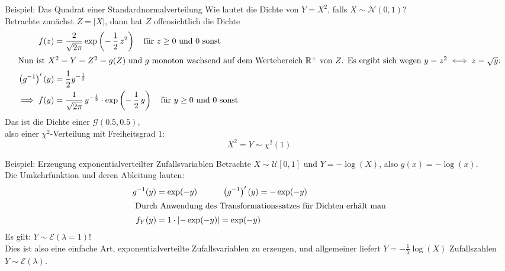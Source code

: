 \documentclass[
  10pt,
  ignorenonframetext,
]{beamer}
\begin{document}
\begin{frame}{Beispiel: Das Quadrat einer Standardnormalverteilung}
\protect\hypertarget{beispiel-das-quadrat-einer-standardnormalverteilung}{}
Wie lautet die Dichte von \(Y = X^2\), falls
\(X \sim {\mathcal N}(0,1)\)?\\
Betrachte zunächst \(Z = |X|\), dann hat \(Z\) offensichtlich die Dichte
\begin{align*}
f(z) &= \frac{2}{\sqrt{2 \pi}} \exp\left(- \, \frac{1}{2}\, z^2\right)
\quad \mbox{für $z \geq 0$ und $0$ sonst}\\
\intertext{Nun ist $X^2 = Y = Z^2 = g(Z)$ und $g$ monoton wachsend auf dem Wertebereich
$\mathbb{R}^+$ von $Z$. Es ergibt sich wegen $y = z^2 \iff z = \sqrt{y}$:}
\left(g^{-1}\right)'(y) &=  \frac{1}{2} y^{-\frac{1}{2}} \\
\implies f(y) & =  \frac{1}{\sqrt{2 \pi}}\, y^{-\frac{1}{2}}  \cdot \exp\left(- \, \frac{1}{2}\, y\right) \quad \mbox{für $y \geq 0$ und $0$ sonst}
\end{align*} Das ist die Dichte einer \({\mathcal G}(0.5, 0.5)\),\\
also einer \(\chi^2\)-Verteilung mit Freiheitsgrad \(1\):\\
\[X^2 = Y \sim \chi^2(1)\]
\end{frame}

\begin{frame}{Beispiel: Erzeugung exponentialverteilter
Zufallsvariablen}
\protect\hypertarget{beispiel-erzeugung-exponentialverteilter-zufallsvariablen}{}
Betrachte \(X \sim \mathcal{U}[0, 1]\) und \(Y = -\log(X)\), also
\(g(x) = -\log(x)\).\\
Die Umkehrfunktion und deren Ableitung lauten: \begin{align*}
g^{-1}(y) &= \exp(-y) \qquad\quad \left(g^{-1}\right)'(y) = -\exp(-y) \\
\intertext{
Durch Anwendung des Transformationssatzes für Dichten erhält man}
f_Y(y) &= 1 \cdot \left| -\exp(-y) \right| = \exp(-y)
\end{align*} Es gilt: \(Y \sim {\mathcal E}(\lambda = 1)\)!\\
Dies ist also eine einfache Art, exponentialverteilte Zufallsvariablen
zu erzeugen, und allgemeiner liefert \(Y = -\frac{1}{\lambda} \log(X)\)
Zufallszahlen \(Y \sim {\mathcal E}(\lambda)\).

\end{frame}
\end{document}
